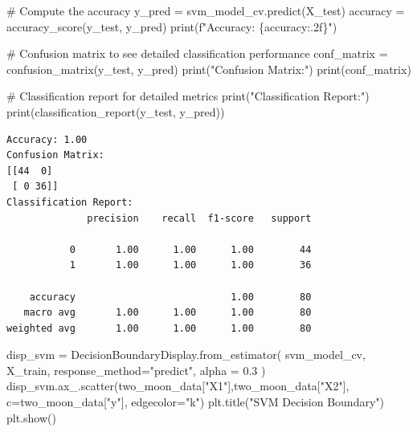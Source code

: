 \documentclass[
  letterpaper,
  DIV=11,
  numbers=noendperiod]{scrartcl}
\newenvironment{Shaded}{\begin{snugshade}}{\end{snugshade}}
\newcommand{\BuiltInTok}[1]{\textcolor[rgb]{0.00,0.23,0.31}{#1}}
\newcommand{\CommentTok}[1]{\textcolor[rgb]{0.37,0.37,0.37}{#1}}
\newcommand{\FloatTok}[1]{\textcolor[rgb]{0.68,0.00,0.00}{#1}}
\newcommand{\NormalTok}[1]{\textcolor[rgb]{0.00,0.23,0.31}{#1}}
\newcommand{\OperatorTok}[1]{\textcolor[rgb]{0.37,0.37,0.37}{#1}}
\newcommand{\SpecialCharTok}[1]{\textcolor[rgb]{0.37,0.37,0.37}{#1}}
\newcommand{\SpecialStringTok}[1]{\textcolor[rgb]{0.13,0.47,0.30}{#1}}
\newcommand{\StringTok}[1]{\textcolor[rgb]{0.13,0.47,0.30}{#1}}
\begin{document}
\begin{Shaded}
\begin{Highlighting}[]
\CommentTok{\# Compute the accuracy}
\NormalTok{y\_pred }\OperatorTok{=}\NormalTok{ svm\_model\_cv.predict(X\_test)}
\NormalTok{accuracy }\OperatorTok{=}\NormalTok{ accuracy\_score(y\_test, y\_pred)}
\BuiltInTok{print}\NormalTok{(}\SpecialStringTok{f"Accuracy: }\SpecialCharTok{\{}\NormalTok{accuracy}\SpecialCharTok{:.2f\}}\SpecialStringTok{"}\NormalTok{)}

\CommentTok{\# Confusion matrix to see detailed classification performance}
\NormalTok{conf\_matrix }\OperatorTok{=}\NormalTok{ confusion\_matrix(y\_test, y\_pred)}
\BuiltInTok{print}\NormalTok{(}\StringTok{"Confusion Matrix:"}\NormalTok{)}
\BuiltInTok{print}\NormalTok{(conf\_matrix)}

\CommentTok{\# Classification report for detailed metrics}
\BuiltInTok{print}\NormalTok{(}\StringTok{"Classification Report:"}\NormalTok{)}
\BuiltInTok{print}\NormalTok{(classification\_report(y\_test, y\_pred))}
\end{Highlighting}
\end{Shaded}

\begin{verbatim}
Accuracy: 1.00
Confusion Matrix:
[[44  0]
 [ 0 36]]
Classification Report:
              precision    recall  f1-score   support

           0       1.00      1.00      1.00        44
           1       1.00      1.00      1.00        36

    accuracy                           1.00        80
   macro avg       1.00      1.00      1.00        80
weighted avg       1.00      1.00      1.00        80
\end{verbatim}

\begin{Shaded}
\begin{Highlighting}[]
\NormalTok{disp\_svm }\OperatorTok{=}\NormalTok{ DecisionBoundaryDisplay.from\_estimator(}
\NormalTok{    svm\_model\_cv,}
\NormalTok{    X\_train,}
\NormalTok{    response\_method}\OperatorTok{=}\StringTok{"predict"}\NormalTok{,}
\NormalTok{    alpha }\OperatorTok{=} \FloatTok{0.3}
\NormalTok{)}
\NormalTok{disp\_svm.ax\_.scatter(two\_moon\_data[}\StringTok{"X1"}\NormalTok{],two\_moon\_data[}\StringTok{"X2"}\NormalTok{], c}\OperatorTok{=}\NormalTok{two\_moon\_data[}\StringTok{"y"}\NormalTok{], edgecolor}\OperatorTok{=}\StringTok{"k"}\NormalTok{)}
\NormalTok{plt.title(}\StringTok{"SVM Decision Boundary"}\NormalTok{)}
\NormalTok{plt.show()}
\end{Highlighting}
\end{Shaded}
\end{document}
